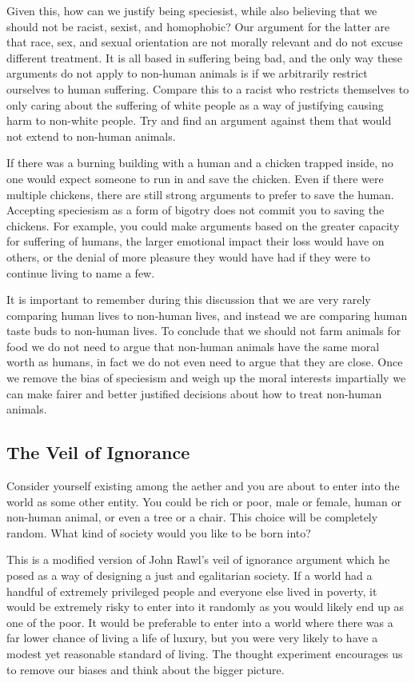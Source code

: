 Given this, how can we justify being speciesist, while also believing that we should not be racist, sexist, and homophobic? Our argument for the latter are that race, sex, and sexual orientation are not morally relevant and do not excuse different treatment. It is all based in suffering being bad, and the only way these arguments do not apply to non-human animals is if we arbitrarily restrict ourselves to human suffering. Compare this to a racist who restricts themselves to only caring about the suffering of white people as a way of justifying causing harm to non-white people. Try and find an argument against them that would not extend to non-human animals.

If there was a burning building with a human and a chicken trapped inside, no one would expect someone to run in and save the chicken. Even if there were multiple chickens, there are still strong arguments to prefer to save the human. Accepting speciesism as a form of bigotry does not commit you to saving the chickens. For example, you could make arguments based on the greater capacity for suffering of humans, the larger emotional impact their loss would have on others, or the denial of more pleasure they would have had if they were to continue living to name a few.

It is important to remember during this discussion that we are very rarely comparing human lives to non-human lives, and instead we are comparing human taste buds to non-human lives. To conclude that we should not farm animals for food we do not need to argue that non-human animals have the same moral worth as humans, in fact we do not even need to argue that they are close. Once we remove the bias of speciesism and weigh up the moral interests impartially we can make fairer and better justified decisions about how to treat non-human animals.

\subsection{The Veil of Ignorance}

Consider yourself existing among the aether and you are about to enter into the world as some other entity. You could be rich or poor, male or female, human or non-human animal, or even a tree or a chair. This choice will be completely random. What kind of society would you like to be born into?

This is a modified version of John Rawl's veil of ignorance argument which he posed as a way of designing a just and egalitarian society. If a world had a handful of extremely privileged people and everyone else lived in poverty, it would be extremely risky to enter into it randomly as you would likely end up as one of the poor. It would be preferable to enter into a world where there was a far lower chance of living a life of luxury, but you were very likely to have a modest yet reasonable standard of living. The thought experiment encourages us to remove our biases and think about the bigger picture.

